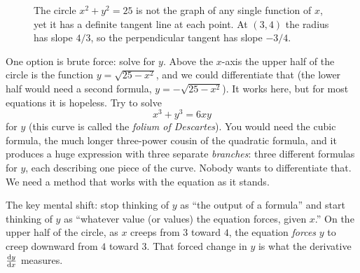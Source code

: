 \begin{figure}[H]
\centering
{}
\caption{The circle $x^2+y^2=25$ is not the graph of any single function of $x$, yet it has a
definite tangent line at each point. At $(3,4)$ the radius has slope $4/3$, so the perpendicular
tangent has slope $-3/4$.}
\label{ch13:fig-circle}
\end{figure}

One option is brute force: solve for $y$. Above the $x$-axis the upper half of the circle is the
function $y = \sqrt{25 - x^2}$, and we could differentiate that (the lower half would need a
second formula, $y = -\sqrt{25-x^2}$). It works here, but for most equations it is hopeless. Try to
solve
\[
x^3 + y^3 = 6xy
\]
for $y$ (this curve is called the \emph{folium of Descartes}). You would need the cubic formula,
the much longer three-power cousin of the quadratic formula, and it produces a huge expression
with three separate \emph{branches}: three different formulas for $y$, each describing one piece
of the curve. Nobody wants to differentiate that. We need a method that works with the equation as
it stands.

\begin{intuitionbox}
The key mental shift: stop thinking of $y$ as ``the output of a formula'' and start thinking of $y$
as ``whatever value (or values) the equation forces, given $x$.'' On the upper half of the circle,
as $x$ creeps from $3$ toward $4$, the equation \emph{forces} $y$ to creep downward from $4$ toward
$3$. That forced change in $y$ is what the derivative $\frac{\mathrm{d} y}{\mathrm{d} x}$ measures.
\end{intuitionbox}

